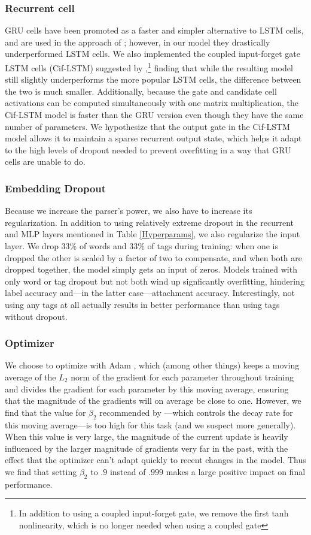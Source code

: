 \documentclass[11pt,a4paper]{article}
\begin{document}
\subsubsection{Recurrent cell}
GRU cells have been promoted as a faster and simpler alternative to LSTM cells, and are used in the approach of \citet{Chengetal2016}; however, in our model they drastically underperformed LSTM cells. We also implemented the coupled input-forget gate LSTM cells (Cif-LSTM) suggested by \citet{Greffetal2015},\footnote{In addition to using a coupled input-forget gate, we remove the first tanh nonlinearity, which is no longer needed when using a coupled gate} finding that while the resulting model still slightly underperforms the more popular LSTM cells, the difference between the two is much smaller. Additionally, because the gate and candidate cell activations can be computed simultaneously with one matrix multiplication, the Cif-LSTM model is faster than the GRU version even though they have the same number of parameters. We hypothesize that the output gate in the Cif-LSTM model allows it to maintain a sparse recurrent output state, which helps it adapt to the high levels of dropout needed to prevent overfitting in a way that GRU cells are unable to do. 

\subsubsection{Embedding Dropout}
Because we increase the parser's power, we also have to increase its regularization. In addition to using relatively extreme dropout in the recurrent and MLP layers mentioned in Table \ref{Hyperparams}, we also regularize the input layer. We drop 33\%{} of words and 33\%{} of tags during training: when one is dropped the other is scaled by a factor of two to compensate, and when both are dropped together, the model simply gets an input of zeros. Models trained with only word or tag dropout but not both wind up signficantly overfitting, hindering label accuracy and---in the latter case---attachment accuracy. Interestingly, not using any tags at all actually results in better performance than using tags without dropout.

\subsubsection{Optimizer}
We choose to optimize with Adam \citep{KingmaBa2014}, which (among other things) keeps a moving average of the $L_2$ norm of the gradient for each parameter throughout training and divides the gradient for each parameter by this moving average, ensuring that the magnitude of the gradients will on average be close to one. However, we find that the value for $\beta_2$ recommended by \citeauthor{KingmaBa2014}---which controls the decay rate for this moving average---is too high for this task (and we suspect more generally). When this value is very large, the magnitude of the current update is heavily influenced by the larger magnitude of gradients very far in the past, with the effect that the optimizer can't adapt quickly to recent changes in the model. Thus we find that setting $\beta_2$ to $.9$ instead of $.999$ makes a large positive impact on final performance.
\end{document}
